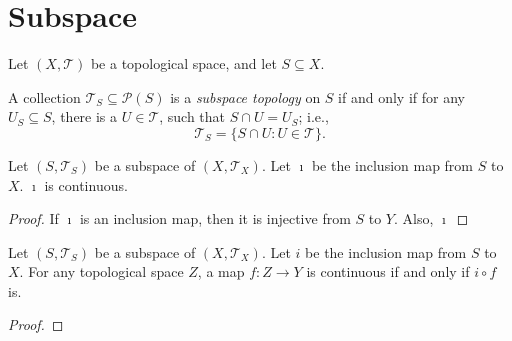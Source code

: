 \section{Subspace}


Let $(X, \mathcal T)$ be a topological space, and let $S \subseteq X$.


\begin{definition}
	A collection $\mathcal T_S \subseteq \mathcal P(S)$ is a \textit{subspace topology} on $S$ if and only if for any $U_S \subseteq S$, there is a $U \in \mathcal T$, such that $S \cap U = U_S$; i.e.,
	$$
	\mathcal T_S = \{ S \cap U : U \in \mathcal T \}. %
	$$
\end{definition}


\begin{proposition}
	Let $(S, \mathcal T_S)$ be a subspace of $(X, \mathcal T_X)$. Let $\imath$ be the inclusion map from $S$ to $X$. $\imath$ is continuous.
	
	\begin{proof}
		If $\imath$ is an inclusion map, then it is injective from $S$ to $Y$. Also, $\imath$
	\end{proof}
\end{proposition}


\begin{proposition}
	Let $(S, \mathcal T_S)$ be a subspace of $(X, \mathcal T_X)$. Let $i$ be the inclusion map from $S$ to $X$. For any topological space $Z$, a map $f: Z \to Y$ is continuous if and only if $i \circ f$ is.
	
	\begin{proof}
		
	\end{proof}
\end{proposition}







































